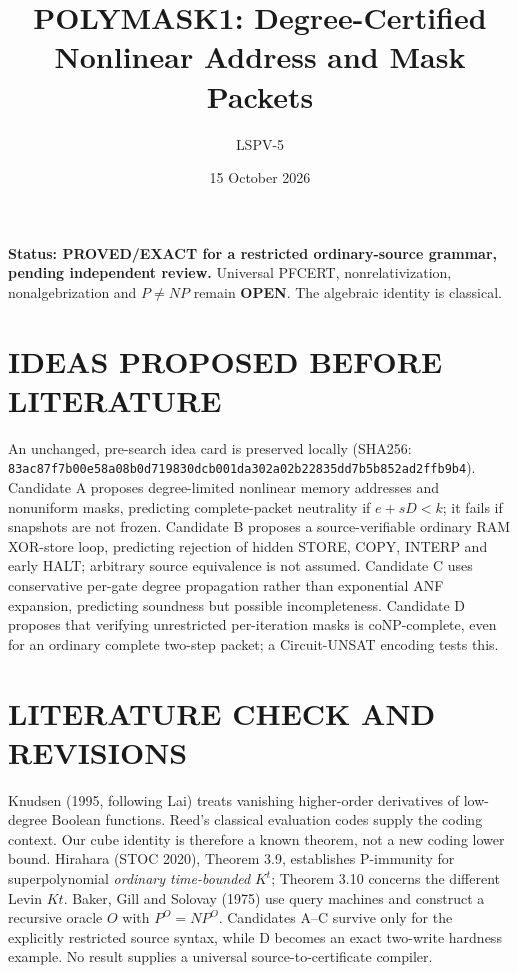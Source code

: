 \documentclass{article}
\title{POLYMASK1: Degree-Certified Nonlinear Address and Mask Packets}
\author{LSPV-5}
\date{15 October 2026}
\begin{document}
\maketitle
\noindent\textbf{Status: PROVED/EXACT for a restricted ordinary-source grammar, pending independent review.} Universal PFCERT, nonrelativization, nonalgebrization and $P\ne NP$ remain \textbf{OPEN}. The algebraic identity is classical.

\section{IDEAS PROPOSED BEFORE LITERATURE}
An unchanged, pre-search idea card is preserved locally (SHA256: \texttt{83ac87f7b00e58a08b0d719830dcb001da302a02b22835dd7b5b852ad2ffb9b4}). Candidate A proposes degree-limited nonlinear memory addresses and nonuniform masks, predicting complete-packet neutrality if $e+sD<k$; it fails if snapshots are not frozen. Candidate B proposes a source-verifiable ordinary RAM XOR-store loop, predicting rejection of hidden STORE, COPY, INTERP and early HALT; arbitrary source equivalence is not assumed. Candidate C uses conservative per-gate degree propagation rather than exponential ANF expansion, predicting soundness but possible incompleteness. Candidate D proposes that verifying unrestricted per-iteration masks is coNP-complete, even for an ordinary complete two-step packet; a Circuit-UNSAT encoding tests this.

\section{LITERATURE CHECK AND REVISIONS}
Knudsen (1995, following Lai) treats vanishing higher-order derivatives of low-degree Boolean functions. Reed's classical evaluation codes supply the coding context. Our cube identity is therefore a known theorem, not a new coding lower bound. Hirahara (STOC 2020), Theorem 3.9, establishes P-immunity for superpolynomial \emph{ordinary time-bounded} $K^t$; Theorem 3.10 concerns the different Levin $Kt$. Baker, Gill and Solovay (1975) use query machines and construct a recursive oracle $O$ with $P^O=NP^O$. Candidates A--C survive only for the explicitly restricted source syntax, while D becomes an exact two-write hardness example. No result supplies a universal source-to-certificate compiler.
\end{document}
